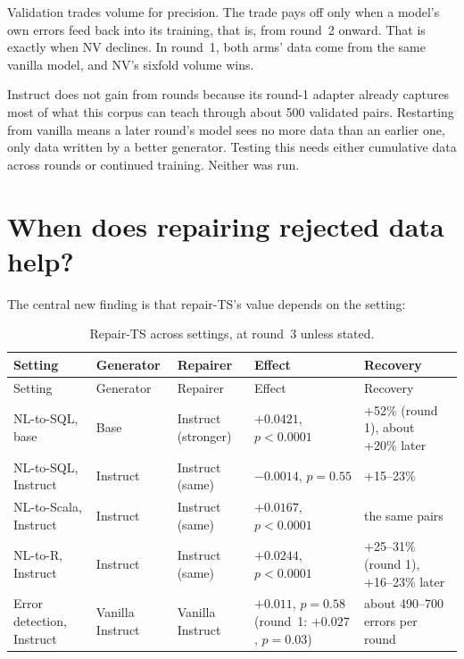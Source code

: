 \begin{interpretation}
Validation trades volume for precision. The trade pays off only when a model's own errors feed back into its training,
that is, from round~2 onward. That is exactly when NV declines. In round~1, both arms' data come from the same vanilla
model, and NV's sixfold volume wins.
\end{interpretation}

\begin{hypothesis}
Instruct does not gain from rounds because its round-1 adapter already captures most of what this corpus can teach
through about 500 validated pairs. Restarting from vanilla means a later round's model sees no more data than an
earlier one, only data written by a better generator. Testing this needs either cumulative data across rounds or
continued training. Neither was run.
\end{hypothesis}

\section{When does repairing rejected data help?}

The central new finding is that repair-TS's value depends on the setting:

{\small
{}
\begin{longtable}{@{}p{3.0cm}p{2.1cm}p{2.4cm}p{3.3cm}p{3.6cm}@{}}
\caption{Repair-TS across settings, at round~3 unless stated.}\label{tab:repair-summary}\\
\toprule\rowcolor{headshade}Setting & Generator & Repairer & Effect & Recovery\\\midrule\endfirsthead
\toprule\rowcolor{headshade}Setting & Generator & Repairer & Effect & Recovery\\\midrule\endhead
\bottomrule\endfoot
NL-to-SQL, base & Base & Instruct (stronger) & $+0.0421$, $p<0.0001$ & +52\% (round 1), about +20\% later\\
NL-to-SQL, Instruct & Instruct & Instruct (same) & $-0.0014$, $p=0.55$ & +15--23\%\\
NL-to-Scala, Instruct & Instruct & Instruct (same) & $+0.0167$, $p<0.0001$ & the same pairs\\
NL-to-R, Instruct & Instruct & Instruct (same) & $+0.0244$, $p<0.0001$ & +25--31\% (round 1), +16--23\% later\\
Error detection, Instruct & Vanilla Instruct & Vanilla Instruct & $+0.011$, $p=0.58$ (round~1: $+0.027$, $p=0.03$) &
about 490--700 errors per round\\
\end{longtable}
}

